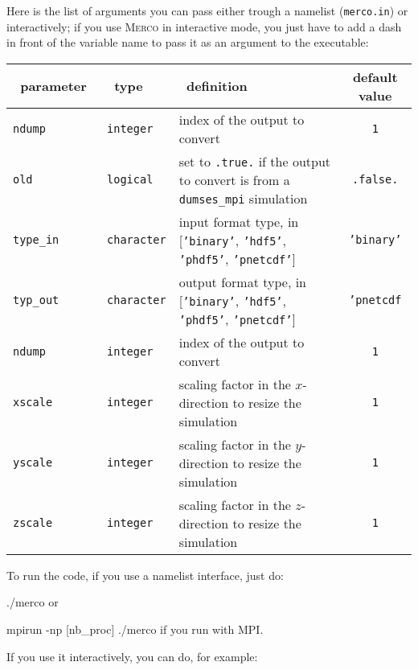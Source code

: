 \documentclass[a4paper,12pt]{article}
\newenvironment{codeblock}[2][]{%
    \minted[bgcolor=LightGray!80!white,fontsize=\small,#1]{#2}%
}{%
    \endminted%
}%
\newenvironment{codeblock}[2][]{\small\verbatim}{\endverbatim}
\begin{document}
Here is the list of arguments you can pass either trough a namelist (\texttt{merco.in}) or interactively; if you use \textsc{Merco} in interactive mode, you just have to add a dash in front of the variable name to pass it as an argument to the executable:
\clearpage
\begin{table}[h!]
  \centering
  {\footnotesize
  \begin{tabular}{l | l | p{} | c }
    ~\hfill parameter\hfill~ & ~\hfill type\hfill~ & ~\hfill definition\hfill~ & default value \\
    \hline
    \hline
    \texttt{ndump} & \texttt{integer} & index of the output to convert & \texttt{1} \\
    \texttt{old} & \texttt{logical} & set to \texttt{.true.} if the output to convert is from a \texttt{dumses\_mpi} simulation & \texttt{.false.} \\
    \texttt{type\_in} & \texttt{character} & input format type, in [\texttt{'binary'}, \texttt{'hdf5'}, \texttt{'phdf5'}, \texttt{'pnetcdf'}] & \texttt{'binary'} \\
    \texttt{typ\_out} & \texttt{character} & output format type, in [\texttt{'binary'}, \texttt{'hdf5'}, \texttt{'phdf5'}, \texttt{'pnetcdf'}] & \texttt{'pnetcdf} \\
    \texttt{ndump} & \texttt{integer} & index of the output to convert & \texttt{1} \\
    \texttt{xscale} & \texttt{integer} & scaling factor in the $x$-direction to resize the simulation & \texttt{1} \\
    \texttt{yscale} & \texttt{integer} & scaling factor in the $y$-direction to resize the simulation & \texttt{1} \\
    \texttt{zscale} & \texttt{integer} & scaling factor in the $z$-direction to resize the simulation & \texttt{1} \\
    \hline
    \end{tabular}
  }
\end{table}

To run the code, if you use a namelist interface, just do:

\begin{codeblock}{bash}
  ./merco
\end{codeblock}
or

\begin{codeblock}{bash}
  mpirun -np [nb_proc] ./merco
\end{codeblock}
if you run with MPI.

If you use it interactively, you can do, for example:
\end{document}
